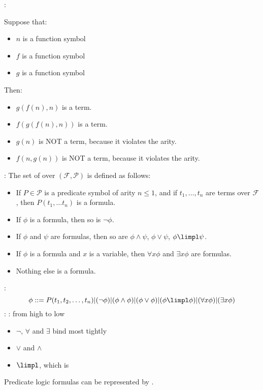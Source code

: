     :
      \par Suppose that:
      \begin{itemize}
        \item $n$ is a  function symbol
        \item $f$ is a  function symbol
        \item $g$ is a  function symbol
      \end{itemize}
      \par Then:
      \begin{itemize}
        \item $g(f(n), n)$ is a term.
        \item $f(g(f(n), n))$ is a term.
        \item $g(n)$ is NOT a term, because it violates the arity.
        \item $f(n, g(n))$ is NOT a term, because it violates the arity.
      \end{itemize}

    : The set of  over $(\mathcal{F}, \mathcal{P})$ is defined as follows:
      \begin{itemize}
        \item If $P \in \mathcal{P}$ is a predicate symbol of arity $n \leq 1$, and if $t_1, \ldots, t_n$ are terms over $\mathcal{F}$, then $P(t_1, \ldots t_n)$ is a formula.
        \item If $\phi$ is a formula, then so is $\lnot \phi$.
        \item If $\phi$ and $\psi$ are formulas, then so are $\phi \land \psi$, $\phi \lor \psi$, $\phi \limpl \psi$.
        \item If $\phi$ is a formula and $x$ is a variable, then $\forall x \phi$ and $\exists x \phi$ are formulas.
        \item Nothing else is a formula.
      \end{itemize}
    \par {}:
      \[
        \phi ::= P(t_1, t_2, \ldots, t_n)
          | (\lnot \phi)
          | (\phi \land \phi)
          | (\phi \lor \phi)
          | (\phi \limpl \phi)
          | (\forall x \phi)
          | (\exists x \phi)
      \]
    : : from high to low
      \begin{itemize}
        \item $\lnot$, $\forall$ and $\exists$ bind most tightly
        \item $\lor$ and $\land$
        \item $\limpl$, which is 
      \end{itemize}
    \par Predicate logic formulas can be represented by .

